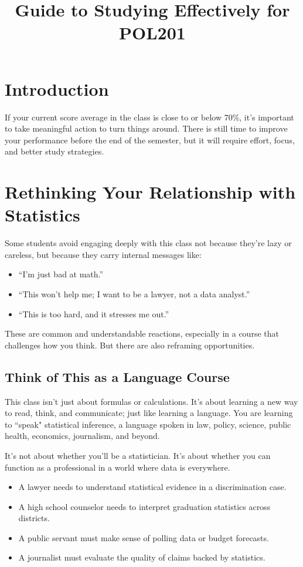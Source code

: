 \documentclass[12pt]{article}
\title{Guide to Studying Effectively for POL201}
\date{}
\begin{document}
\maketitle

\section*{Introduction}

If your current score average in the class is close to or below 70\%, it’s important to take meaningful action to turn things around. There is still time to improve your performance before the end of the semester, but it will require effort, focus, and better study strategies.

\section*{Rethinking Your Relationship with Statistics}

Some students avoid engaging deeply with this class not because they’re lazy or careless, but because they carry internal messages like:
\begin{itemize}
    \item ``I’m just bad at math.''
    \item ``This won’t help me; I want to be a lawyer, not a data analyst.''
    \item ``This is too hard, and it stresses me out.''
\end{itemize}

These are common and understandable reactions, especially in a course that challenges how you think. But there are also reframing opportunities.

\subsection*{Think of This as a Language Course}

This class isn't just about formulas or calculations. It’s about learning a new way to read, think, and communicate; just like learning a language. You are learning to ``speak" statistical inference, a language spoken in law, policy, science, public health, economics, journalism, and beyond.

It’s not about whether you’ll be a statistician. It’s about whether you can function as a professional in a world where data is everywhere.
\begin{itemize}
    \item A lawyer needs to understand statistical evidence in a discrimination case.
    \item A high school counselor needs to interpret graduation statistics across districts.
    \item A public servant must make sense of polling data or budget forecasts.
    \item A journalist must evaluate the quality of claims backed by statistics.
\end{itemize}
\end{document}
